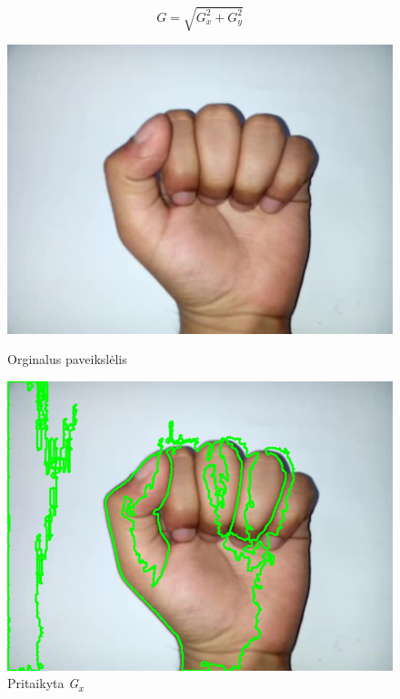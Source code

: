 \documentclass{VUMIFInfKursinis}
\begin{document}
\begin{equation}\label{eq:sobelg}
G = \sqrt{G_x^2 + G_y^2}
\end{equation}

\begin{figure}[H]
	\begin{minipage}{.3\textwidth}
		\centering
		\includegraphics[width=.8\linewidth]{img/A}
		\caption{Orginalus paveikslėlis}
		\label{img:a-sign}
	\end{minipage}\hspace{\fill}%
	\begin{minipage}{.3\textwidth}
		\centering
		\includegraphics[width=.8\linewidth]{img/A-sobelX}
		\caption{Pritaikyta \textit{G\textsubscript{x}}}
		\label{img:a-sobelX}
	\end{minipage}\hspace{\fill}%
	\begin{minipage}{.3\textwidth}

\end{minipage}
\end{figure}
\end{document}
